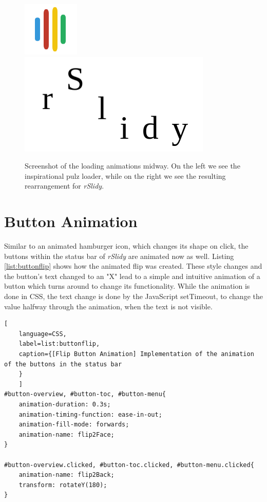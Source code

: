 \begin{figure}[tp]
	\centering
	\includegraphics[width = .25\textwidth]{images/pulzLoad.png}
	\includegraphics[width = .5\textwidth]{images/loading.png}	
	\caption[Loader]{
		Screenshot of the loading animations midway. On the left we see the inspirational pulz loader, while on the right we see the resulting rearrangement for \textit{rSlidy}.
	}
	\label{fig:loading}
\end{figure}


\section{Button Animation} %
\label{sec:button_animation}

Similar to an animated hamburger icon, which changes its shape on click, the buttons within the status bar of \textit{rSlidy} are animated now as well. Listing \ref{list:buttonflip} shows how the animated flip was created. These style changes and the button's text changed to an "X" lead to a simple and intuitive animation of a button which turns around to change its functionality. While the animation is done in CSS, the text change is done by the JavaScript setTimeout, to change the value halfway through the animation, when the text is not visible.
\begin{minipage}{\linewidth}
	\begin{lstlisting}[
	language=CSS,
	label=list:buttonflip,
	caption={[Flip Button Animation] Implementation of the animation of the buttons in the status bar
	}
	]
#button-overview, #button-toc, #button-menu{ 
	animation-duration: 0.3s; 
	animation-timing-function: ease-in-out;
	animation-fill-mode: forwards;
	animation-name: flip2Face;
}

#button-overview.clicked, #button-toc.clicked, #button-menu.clicked{
	animation-name: flip2Back; 
	transform: rotateY(180);
}
	\end{lstlisting}
\end{minipage}

